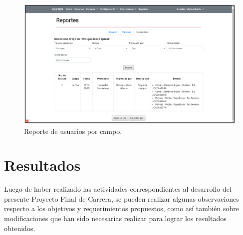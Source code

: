 \documentclass[11pt,oneside]{book}
\begin{document}
\begin{figure}[tbhp]
\centerline{\includegraphics[scale=0.87]{figs/capitulo_3_desarrollo/fig427.pdf}}
\caption{Reporte de usuarios por campo.}
\label{fig427}
\end{figure}

\newpage
\section{Resultados}
Luego de haber realizado las actividades correspondientes al desarrollo del presente Proyecto Final de Carrera, se pueden realizar algunas observaciones respecto a los objetivos y requerimientos propuestos, como así también sobre modificaciones que han sido necesarias realizar para lograr los resultados obtenidos.
\end{document}
